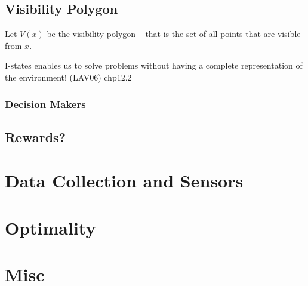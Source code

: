 \subsection{Visibility Polygon}
Let \(V(x)\) be the visibility polygon -- that is the set of all points that are
visible from \(x\).

I-states enables us to solve problems without having a complete representation
of the environment! (LAV06) chp12.2



\subsubsection{Decision Makers}

\subsection{Rewards?}

\section{Data Collection and Sensors}



\section{Optimality}

\section{Misc}

